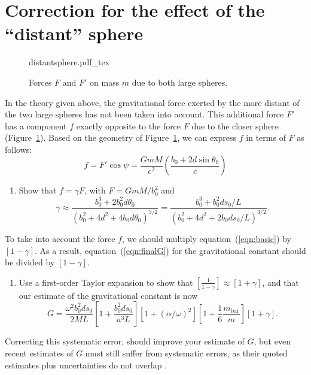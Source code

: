\documentclass{article}
\begin{document}
\section*{Correction for the effect of the ``distant'' sphere}
\begin{figure}
  \centering
  \def\svgwidth{0.5\columnwidth}
  {distantsphere.pdf_tex}
  \caption{Forces $F$ and $F'$ on mass $m$ due to both large spheres.}
  \label{fig:five}
\end{figure}
In the theory given above, the gravitational force exerted by the more
distant of the two large spheres has not been taken into account. This
additional force $F'$ has a component $f$ exactly opposite to the
force $F$ due to the closer sphere (Figure~\ref{fig:five}).
Based on the geometry of Figure~\ref{fig:five}, we can express $f$ in
terms of $F$ as follows:%
\[
f=F'\cos\psi=\frac{GmM}{c^{2}}\left(  \frac{b_0+2d\sin\theta_{0}}%
  {c}\right)  %
\]
\begin{enumerate}[resume]
\item Show that $f = \gamma F$,  with $F=GmM/b_0^{2}$ and%
  \begin{equation}
    \gamma\approx\frac{b_0^{3}+2b_0^{2}d\theta_{0}}{\left(  b_0^{2}+4d^{2}+4b_0d\theta
        _{0}\right)  ^{3/2}}=\frac{b_0^{3}+b_0^{2}ds_{0}/L}{\left(  b_0^{2}+4d^{2}%
        +2b_0ds_{0}/L\right)  ^{3/2}}. 
    \label{eqn:gamma}%
  \end{equation}
\end{enumerate}

To take into account the force $f$, we should multiply
equation~(\ref{eqn:basic}) by $\left[ 1-\gamma\right]$. As a result,
equation~(\ref{eqn:finalG}) for the gravitational constant should be
divided by $\left[1-\gamma\right]$.

\begin{enumerate}[resume]
\item Use a first-order Taylor expansion to show that $\left[
    \frac{1}{1-\gamma}\right] \approx [1+\gamma]$, and that our
  estimate of the gravitational constant is now
\begin{equation}
  G=\frac{\omega^{2}b_0^{2}ds_{0}}{2ML}
  \left[ 1+\frac{b_0^{2}ds_{0}}{a^3L}\right]  
  \left[1+\left(\alpha/\omega\right)
    ^{2}\right]  
  \left[  1+\frac{1}{6}\frac{m_{\mathrm{bar}}}{m}\right][1+\gamma].
  \label{eqn:finalG3}%
\end{equation}
\end{enumerate}

Correcting this systematic error, should improve your estimate of $G$,
but even recent estimates of $G$ must still suffer from systematic
errors, as their quoted estimates plus uncertainties do not overlap
\cite{gillies1997newtonian,mohr2005codata,schlamminger2014fundamental}.
\end{document}
